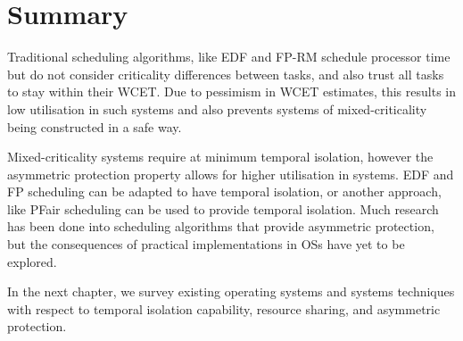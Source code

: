 
\section{Summary}


Traditional scheduling algorithms, like \gls{EDF} and \gls{FP}-\gls{RM} schedule processor time but do not consider criticality differences between tasks, and also trust all tasks to stay within their \gls{WCET}.
Due to pessimism in \gls{WCET} estimates, this results in low utilisation in such systems and also prevents systems of mixed-criticality being constructed in a safe way.

Mixed-criticality systems require at minimum temporal isolation, however the asymmetric protection property allows for higher utilisation in systems.
\gls{EDF} and \gls{FP} scheduling can be adapted to have temporal isolation, or another approach, like PFair scheduling can be used to provide temporal isolation.
Much research has been done into scheduling algorithms that provide asymmetric protection, but the consequences of practical implementations in \glspl{OS} have yet to be explored.

In the next chapter, we survey existing operating systems and systems techniques with respect to temporal isolation capability, resource sharing, and asymmetric protection.

